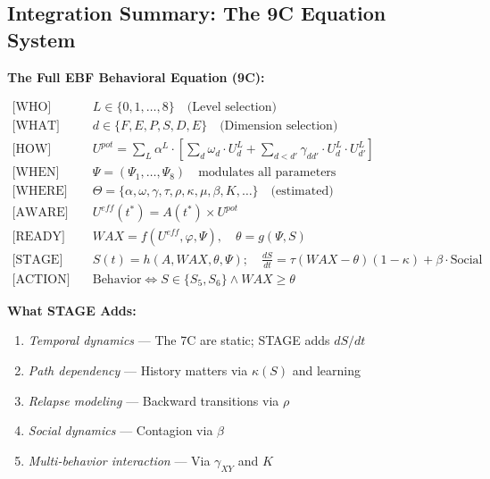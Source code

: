 \subsection{Integration Summary: The 9C Equation System}

\begin{tcolorbox}[colback=green!5!white, colframe=green!75!black,
    title=Complete 9C System Specification]

\textbf{The Full EBF Behavioral Equation (9C):}

\begin{align}
\text{[WHO]} \quad & L \in \{0, 1, \ldots, 8\} \quad \text{(Level selection)} \\[3pt]
\text{[WHAT]} \quad & d \in \{F, E, P, S, D, E\} \quad \text{(Dimension selection)} \\[3pt]
\text{[HOW]} \quad & U^{pot} = \sum_L \alpha^L \cdot \left[\sum_d \omega_d \cdot U^L_d + \sum_{d<d'} \gamma_{dd'} \cdot U^L_d \cdot U^L_{d'}\right] \\[3pt]
\text{[WHEN]} \quad & \Psi = (\Psi_1, \ldots, \Psi_8) \quad \text{modulates all parameters} \\[3pt]
\text{[WHERE]} \quad & \Theta = \{\alpha, \omega, \gamma, \tau, \rho, \kappa, \mu, \beta, K, \ldots\} \quad \text{(estimated)} \\[3pt]
\text{[AWARE]} \quad & U^{eff}(t^*) = A(t^*) \times U^{pot} \\[3pt]
\text{[READY]} \quad & WAX = f(U^{eff}, \varphi, \Psi), \quad \theta = g(\Psi, S) \\[3pt]
\text{[STAGE]} \quad & \boxed{S(t) = h(A, WAX, \theta, \Psi); \quad \frac{dS}{dt} = \tau(WAX - \theta)(1-\kappa) + \beta \cdot \text{Social}} \\[5pt]
\text{[ACTION]} \quad & \text{Behavior} \Leftrightarrow S \in \{S_5, S_6\} \land WAX \geq \theta
\end{align}

\textbf{What STAGE Adds:}
\begin{enumerate}[nosep]
\item \textit{Temporal dynamics} — The 7C are static; STAGE adds $dS/dt$
\item \textit{Path dependency} — History matters via $\kappa(S)$ and learning
\item \textit{Relapse modeling} — Backward transitions via $\rho$
\item \textit{Social dynamics} — Contagion via $\beta$
\item \textit{Multi-behavior interaction} — Via $\gamma_{XY}$ and $K$
\end{enumerate}

\end{tcolorbox}

